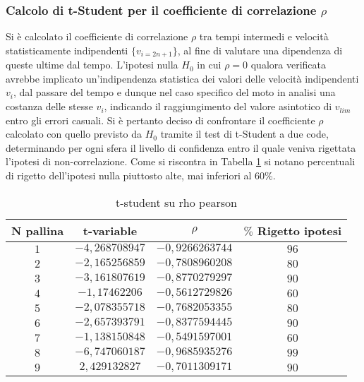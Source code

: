 \documentclass[a4paper,11pt,oneside]{article}
\begin{document}
\subsubsection*{Calcolo di t-Student per il coefficiente di correlazione $\rho$}
Si è calcolato il coefficiente di correlazione $\rho$ tra tempi intermedi e velocità statisticamente indipendenti $\{ v_{i=2n+1}\}$, al fine di valutare una dipendenza di queste ultime dal tempo.
L'ipotesi nulla $H_{0}$ in cui $\rho=0$ qualora verificata avrebbe implicato un'indipendenza statistica dei valori delle velocità indipendenti $v_{i}$, dal passare del tempo e dunque nel caso specifico del moto in analisi una costanza delle stesse $v_{i}$, indicando il raggiungimento del valore asintotico di $v_{lim}$ entro gli errori casuali.  
Si è pertanto deciso di confrontare il coefficiente $\rho$ calcolato con quello previsto da $H_{0}$ tramite il test di t-Student a due code, determinando per ogni sfera il livello di confidenza entro il quale veniva rigettata l'ipotesi di non-correlazione. \newline
Come si riscontra in Tabella \ref{tab:t_student} si notano percentuali di rigetto dell'ipotesi nulla piuttosto alte, mai inferiori al 60\%.





\begin{table}[h!]
\caption{t-student su rho pearson}
\label{tab:t_student}
\centering
\begin{tabular}{|c|c|c|c|}
\hline
 \textbf{N pallina} & t-variable & \textbf{$\rho$} & \textbf{{$\%$ Rigetto ipotesi}} \\ \hline
\rowcolor[rgb]{0.85,0.85,0.85}$1$ & $-4,268708947$ & $-0,9266263744$ & $96$ \\ \hline
 $2$ & $-2,165256859$ & $-0,7808960208$ & $80$ \\ \hline
\rowcolor[rgb]{0.85,0.85,0.85}$3$ & $-3,161807619$ & $-0,8770279297$ & $90$ \\ \hline
 $4$ & $-1,17462206$ & $-0,5612729826$ & $60$ \\ \hline
\rowcolor[rgb]{0.85,0.85,0.85}$5$ & $-2,078355718$ & $-0,7682053355$ & $80$ \\ \hline
 $6$ & $-2,657393791$ & $-0,8377594445$ & $90$ \\ \hline
\rowcolor[rgb]{0.85,0.85,0.85}$7$ & $-1,138150848$ & $-0,5491597001$ & $60$ \\ \hline
 $8$ & $-6,747060187$ & $-0,9685935276$ & $99$ \\ \hline
\rowcolor[rgb]{0.85,0.85,0.85}$9$ & $2,429132827$ & $-0,7011309171$ & $90$ \\ \hline
\end{tabular}
\end{table}
\end{document}
